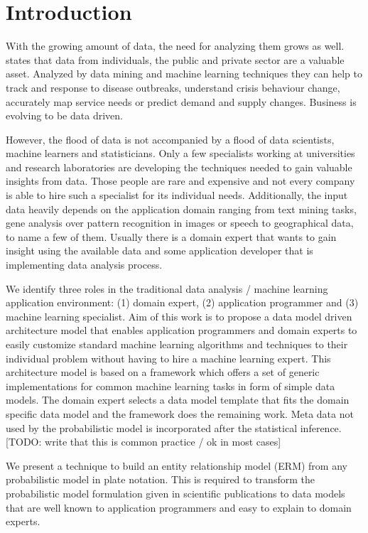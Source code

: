 \section{Introduction}

With the growing amount of data, the need for analyzing them grows as well. \textcite{forum2012bigdata} states that data from individuals, the public and private sector are a valuable asset. Analyzed by data mining and machine learning techniques they can help to track and response to disease outbreaks, understand crisis behaviour change, accurately map service needs or predict demand and supply changes. Business is evolving to be data driven.

However, the flood of data is not accompanied by a flood of data scientists, machine learners and statisticians. Only a few specialists working at universities and research laboratories are developing the techniques needed to gain valuable insights from data. Those people are rare and expensive and not every company is able to hire such a specialist for its individual needs. Additionally, the input data heavily depends on the application domain ranging from text mining tasks, gene analysis over pattern recognition in images or speech to geographical data, to name a few of them. Usually there is a domain expert that wants to gain insight using the available data and some application developer that is implementing data analysis process.

We identify three roles in the traditional data analysis / machine learning application environment: (1) domain expert, (2) application programmer and (3) machine learning specialist. Aim of this work is to propose a data model driven architecture model that enables application programmers and domain experts to easily customize standard machine learning algorithms and techniques to their individual problem without having to hire a machine learning expert. This architecture model is based on a framework which offers a set of generic implementations for common machine learning tasks in form of simple data models. The domain expert selects a data model template that fits the domain specific data model and the framework does the remaining work. Meta data not used by the probabilistic model is incorporated after the statistical inference. [TODO: write that this is common practice / ok in most cases]

We present a technique to build an entity relationship model (ERM) from any probabilistic model in plate notation. This is required to transform the probabilistic model formulation given in scientific publications to data models that are well known to application programmers and easy to explain to domain experts.

